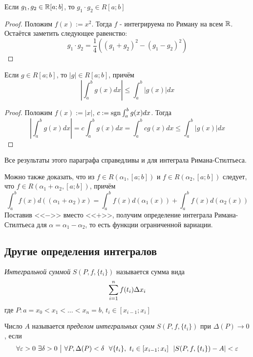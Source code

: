 \begin{corollary}
	Если $g_1, g_2 \in \mathbb{R}[a; b]$, то $g_1 \cdot g_2 \in R[a; b]$
\end{corollary}

\begin{proof}
	Положим $f(x) := x^2$. Тогда $f$ - интегрируема по Риману на всем $\mathbb{R}$. Остаётся заметить следующее равенство:
	\[
		g_1 \cdot g_2 = \frac{1}{4}((g_1 + g_2)^2 - (g_1 - g_2)^2)
	\]
\end{proof}

\begin{corollary}
	Если $g \in R[a; b]$, то $|g| \in R[a; b]$, причём
	\[
		\left|\int_a^b g(x)dx\right| \le \int_a^b |g(x)|dx
	\]
\end{corollary}

\begin{proof}
	Положим $f(x) := |x|$, $c := \operatorname{sgn} \int_a^b g(x)dx$. Тогда
	\[
		\left|\int_a^b g(x)dx\right| = c\int_a^b g(x)dx = \int_a^b cg(x)dx \le \int_a^b |g(x)|dx
	\]
\end{proof}

\begin{note}
	Все результаты этого параграфа справедливы и для интеграла Римана-Стилтьеса.
\end{note}

\begin{note}
	Можно также доказать, что из $f \in R(\alpha_1, [a; b])$ и $f \in R(\alpha_2, [a; b])$ следует, что $f \in R(\alpha_1 + \alpha_2, [a; b])$, причём
	\[
		\int_a^b f(x) d((\alpha_1 + \alpha_2)x) = \int_a^b f(x) d(\alpha_1(x)) + \int_a^b f(x)d(\alpha_2(x))
	\]
	Поставив <<$-$>> вместо <<$+$>>, получим определение интеграла Римана-Стилтьеса для $\alpha = \alpha_1 - \alpha_2$, то есть функции ограниченной вариации.
\end{note}

\subsection{Другие определения интегралов}

\begin{definition}
	\textit{Интегральной суммой} $S(P, f, \{t_i\})$ называется сумма вида
	\[
		\sum\limits_{i = 1}^n f(t_i) \Delta x_i
	\]
	где $P: a = x_0 < x_1 < \ldots < x_n = b$, $t_i \in [x_{i - 1}; x_i]$
\end{definition}

\begin{definition}
	Число $A$ называется \textit{пределом интегральных сумм} $S(P, f, \{t_i\})$ при $\Delta(P) \to 0$, если
	\[
		\forall \varepsilon > 0\ \exists \delta > 0 \ \big|\  \forall P, \Delta(P) < \delta\ \ \forall \{t_i\},\ t_i \in [x_{i - 1}; x_i]\ \ |S(P, f, \{t_i\}) - A| < \varepsilon
	\]
\end{definition}

